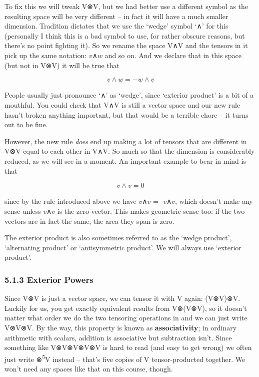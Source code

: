 \documentclass[oneside,english]{amsbook}
\numberwithin{section}{chapter}
\theoremstyle{plain}
\theoremstyle{definition}
\begin{document}
To fix this we will tweak V⊗V, but we had better use a different symbol
as the resulting space will be very different -- in fact it will have a
much smaller dimension. Tradition dictates that we use the `wedge'
symbol `∧' for this (personally I think this is a bad symbol to use,
for rather obscure reasons, but there's no point fighting it). So we
rename the space V∧V and the tensors in it pick up the same notation:
$v$∧$w$ and so on. And we declare that in this space (but not in
V⊗V) it will be true that

\[\underline{v} \land \underline{w} = - \underline{w} \land \underline{v}\]

People usually just pronounce `∧' as `wedge', since `exterior
product' is a bit of a mouthful. You could check that V∧V is still a
vector space and our new rule hasn't broken anything important, but that
would be a terrible chore -- it turns out to be fine.

However, the new rule \emph{does} end up making a lot of tensors that
are different in V⊗V equal to each other in V∧V. So much so that the
dimension is considerably reduced, as we will see in a moment. An
important example to bear in mind is that

\[\underline{v} \land \underline{v} = \underline{0}\]

since by the rule introduced above we have $v$∧$v$ =
-$v$∧$v$, which doesn't make any sense unless $v$∧$v$ is the
zero vector. This makes geometric sense too: if the two vectors are in
fact the same, the area they span is zero.

The exterior product is also sometimes referred to as the `wedge
product', `alternating product' or `antisymmetric product'. We will
always use `exterior product'.

\subsubsection{5.1.3 Exterior Powers}\label{exterior-powers}

Since V⊗V is just a vector space, we can tensor it with V again:
(V⊗V)⊗V. Luckily for us, you get exactly equivalent results from
V⊗(V⊗V), so it doesn't matter what order we do the two tensoring
operations in and we can just write V⊗V⊗V. By the way, this property is
known as \textbf{associativity}; in ordinary arithmetic with scalars,
addition is associative but subtraction isn't. Since something like
V⊗V⊗V⊗V⊗V is hard to read (and easy to get wrong) we often just write
⊗\textsuperscript{5}V instead -- that's five copies of V
tensor-producted together. We won't need any spaces like that on this
course, though.
\end{document}
